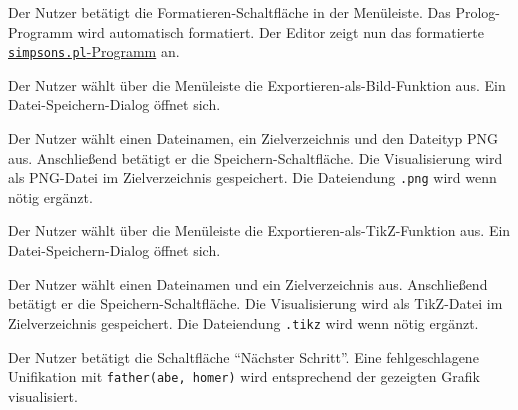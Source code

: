 \documentclass[parskip=full,11pt,twoside]{scrartcl}
\begin{document}

{Der Nutzer betätigt die Formatieren-Schaltfläche in der Menüleiste.}
{Das Prolog-Programm wird automatisch formatiert. Der Editor zeigt nun das formatierte \hyperref[appendix:simpsons]{\texttt{simpsons.pl}-Programm} an.}


{Der Nutzer wählt über die Menüleiste die Exportieren-als-Bild-Funktion aus.}
{Ein Datei-Speichern-Dialog öffnet sich.}

{Der Nutzer wählt einen Dateinamen, ein Zielverzeichnis und den Dateityp PNG aus. Anschließend betätigt er die Speichern-Schaltfläche.}
{Die Visualisierung wird als PNG-Datei im Zielverzeichnis gespeichert. Die Dateiendung \texttt{.png} wird wenn nötig ergänzt.}


{Der Nutzer wählt über die Menüleiste die Exportieren-als-TikZ-Funktion aus.}
{Ein Datei-Speichern-Dialog öffnet sich.}

{Der Nutzer wählt einen Dateinamen und ein Zielverzeichnis aus. Anschließend betätigt er die Speichern-Schaltfläche.}
{Die Visualisierung wird als TikZ-Datei im Zielverzeichnis gespeichert. Die Dateiendung \texttt{.tikz} wird wenn nötig ergänzt.}

\begin{minipage}{\linewidth}
\end{minipage}

\newpage
{}

{Der Nutzer betätigt die Schaltfläche \enquote{Nächster Schritt}.}
{Eine fehlgeschlagene Unifikation mit \texttt{father(abe, homer)} wird entsprechend der gezeigten Grafik visualisiert.}
\end{document}
